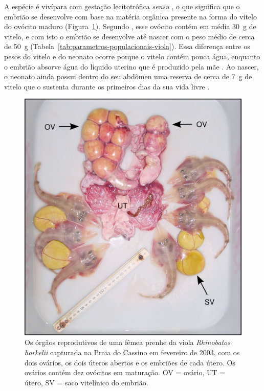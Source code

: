 \documentclass[a4paper,11pt,twoside,showtrims,onecolumn,openright,final]{memoir}
\begin{document}
A espécie é vivípara com gestação lecitotrófica \emph{sensu} \citet{wourms1988}, %
o que significa que o embrião se desenvolve com base na matéria orgânica 
presente na forma do vitelo do ovócito maduro (Figura~\ref{fig:foto-embrioes-viola}). %
Segundo \citet{lessa1982}, esse ovócito contém em média 30~g de vitelo, 
e com isto o embrião se desenvolve até nascer com o peso médio 
de cerca de 50~g (Tabela~\ref{tab:parametros-populacionais-viola}).  
Essa diferença entre os pesos do vitelo e do neonato ocorre porque o 
vitelo contém pouca água, enquanto o embrião absorve água do líquido 
uterino que é produzido pela mãe \citep{ranzi1932}. %
Ao nascer, o neonato ainda possui dentro do seu abdômen uma reserva 
de cerca de 7~g de vitelo que o sustenta durante os primeiros 
dias da sua vida livre \citep{lessa1982}. %

%
%

\begin{figure}
\begin{center}
\includegraphics[width=\textwidth]{VIOLA_UTERO}
\end{center}
\caption[Órgãos reprodutivos de uma fêmea prenhe da viola \emph{Rhinobatos horkelii}]
	{Os órgãos reprodutivos de uma fêmea prenhe da viola \emph{Rhinobatos horkelii}
	 capturada na Praia do Cassino em fevereiro de 2003, com os dois ovários, os dois úteros  
	 abertos e os embriões de cada útero. Os ovários contém dez ovócitos em maturação. OV = ovário, UT = útero, SV = saco vitelínico do embrião.}
\label{fig:foto-embrioes-viola}
\end{figure}
\end{document}

